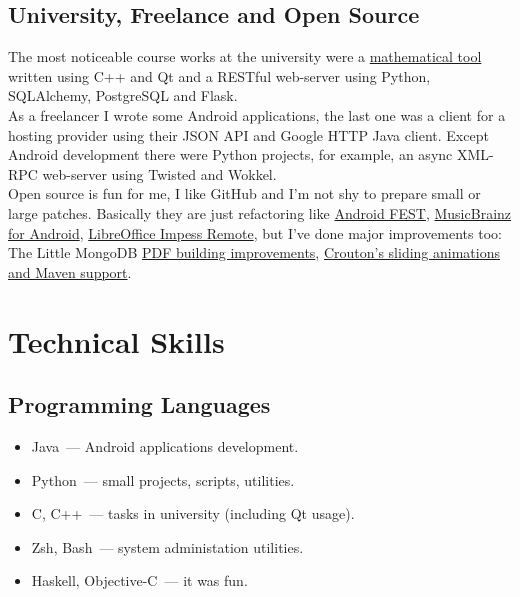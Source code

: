     \subsection*{University, Freelance and Open Source}

      The most noticeable course works at the university were
      a \href{https://github.com/ming13/aequatio}{mathematical tool} written
      using C++ and Qt and a RESTful web-server using Python,
      SQLAlchemy, PostgreSQL and Flask. \\

      As a freelancer I wrote some Android applications, the last one was
      a client for a hosting provider using their JSON API
      and Google HTTP Java client.
      Except Android development there were Python projects, for example,
      an async XML-RPC web-server using Twisted and Wokkel. \\

      Open source is fun for me, I like GitHub and I’m not shy to prepare
      small or large patches. Basically they are just refactoring like
      \href{https://github.com/square/fest-android/commits?author=ming13}{Android FEST},
      \href{https://github.com/jdamcd/musicbrainz-android/commits?author=ming13}{MusicBrainz for Android},
      \href{https://gerrit.libreoffice.org/#/q/owner:%22Artur+Dryomov%22+status:closed,n,z}{LibreOffice Impess Remote},
      but I’ve done major improvements too:
      The Little MongoDB
      \href{https://github.com/karlseguin/the-little-mongodb-book/pull/16}{PDF building improvements},
      \href{https://github.com/keyboardsurfer/Crouton/pulls/ming13?state=closed}{Crouton’s sliding animations and Maven support}.


  \section*{Technical Skills}

    \subsection*{Programming Languages}

      \begin{itemize}

        \item Java~--- Android applications development.

        \item Python~--- small projects, scripts, utilities.

        \item C, C++~--- tasks in university (including Qt usage).

        \item Zsh, Bash~--- system administation utilities.

        \item Haskell, Objective-C~--- it was fun.

      \end{itemize}

